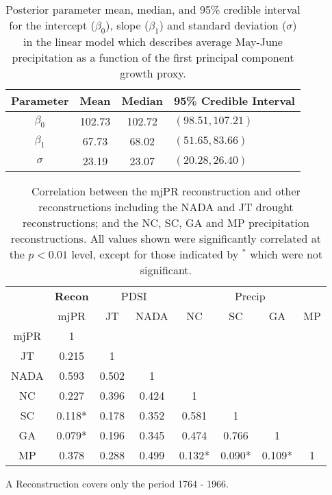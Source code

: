 \begin{table}
\begin{center}
\begin{tabular}{cccl} \toprule
Parameter & Mean   & Median & 95\% Credible Interval \\ \midrule
$\beta_0$ & 102.73 & 102.72       & $(98.51, 107.21)$ \\
$\beta_1$ & 67.73  & 68.02        &  $(51.65, 83.66)$\\
$\sigma$  & 23.19  & 23.07        & $(20.28, 26.40)$   \\  \bottomrule
\end{tabular}
\end{center}
\caption{Posterior parameter mean, median, and 95\% credible interval for the intercept ($\beta_0$), slope ($\beta_1$) and standard deviation ($\sigma$) in the linear model which describes average May-June precipitation as a function of the first principal component growth proxy.}
\label{table:mcmcResults}
\vspace{2cm}
\end{table}


\begin{table}
  \begin{center}
    \begin{threeparttable}[b]
      \begin{tabular}{cccccccc}
\toprule
 & \textbf{Recon} & \multicolumn{2}{c}{PDSI} & \multicolumn{4}{c}{Precip} \\ \cmidrule(lr){2-2} \cmidrule(lr){3-4} \cmidrule(lr){5-8}
      & mjPR & JT & NADA & NC & SC & GA & MP\tnote{A} \\  \midrule
mjPR  &  1      & & & & & & \\
JT    &  0.215  & 1     &       &        &        &        &   \\ 
NADA  &  0.593  & 0.502 & 1     &        &        &        &   \\ 
NC    &  0.227  & 0.396 & 0.424 & 1      &        &        &   \\ 
SC    &  0.118* & 0.178 & 0.352 & 0.581  &  1     &        &   \\ 
GA    &  0.079* & 0.196 & 0.345 & 0.474  & 0.766  & 1      &   \\ 
MP    &  0.378  & 0.288 & 0.499 & 0.132* & 0.090* & 0.109* & 1 \\ \bottomrule
      \end{tabular}
      \begin{tablenotes}
      \item [A] Reconstruction covers only the period 1764 - 1966.
      \end{tablenotes}
    \end{threeparttable}
  \end{center}
      \caption{Correlation between the mjPR reconstruction and other reconstructions including the NADA and JT drought reconstructions; and the NC, SC, GA and MP precipitation reconstructions. All values shown were significantly correlated at the $p<0.01$ level, except for those indicated by $^*$ which were not significant.}
  \label{table:reconComps1}
  \vspace{2cm}
\end{table}

